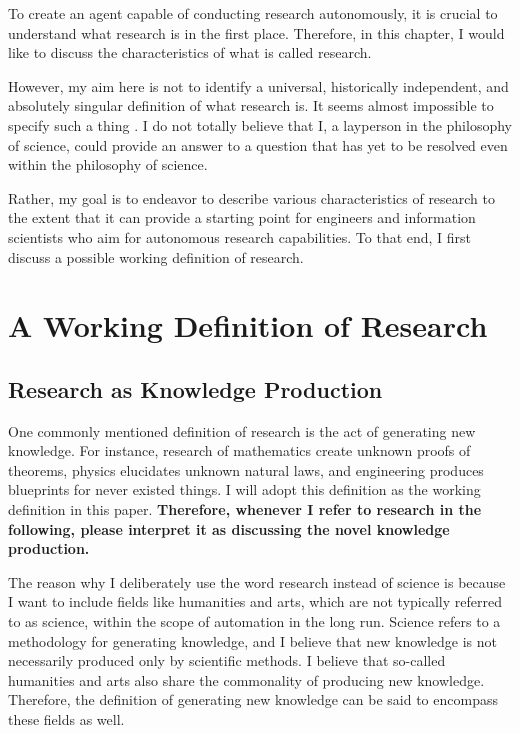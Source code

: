 \documentclass{book}
\begin{document}
To create an agent capable of conducting research autonomously, it is crucial to understand what research is in the first place. Therefore, in this chapter, I would like to discuss the characteristics of what is called research.

However, my aim here is not to identify a universal, historically independent, and absolutely singular definition of what research is. It seems almost impossible to specify such a thing \cite{chalmers2013thing,sep-scientific-method}. I do not totally believe that I, a layperson in the philosophy of science, could provide an answer to a question that has yet to be resolved even within the philosophy of science.

Rather, my goal is to endeavor to describe various characteristics of research to the extent that it can provide a starting point for engineers and information scientists who aim for autonomous research capabilities. To that end, I first discuss a possible working definition of research.

\section{A Working Definition of Research}

\subsection{Research as Knowledge Production}

One commonly mentioned definition of research is the act of generating new knowledge. For instance, research of mathematics create unknown proofs of theorems, physics elucidates unknown natural laws, and engineering produces blueprints for never existed things. I will adopt this definition as the working definition in this paper. \textbf{Therefore, whenever I refer to research in the following, please interpret it as discussing the novel knowledge production.}

The reason why I deliberately use the word research instead of science is because I want to include fields like humanities and arts, which are not typically referred to as science, within the scope of automation in the long run. Science refers to a methodology for generating knowledge, and I believe that new knowledge is not necessarily produced only by scientific methods. I believe that so-called humanities and arts also share the commonality of producing new knowledge. Therefore, the definition of generating new knowledge can be said to encompass these fields as well.
\end{document}
